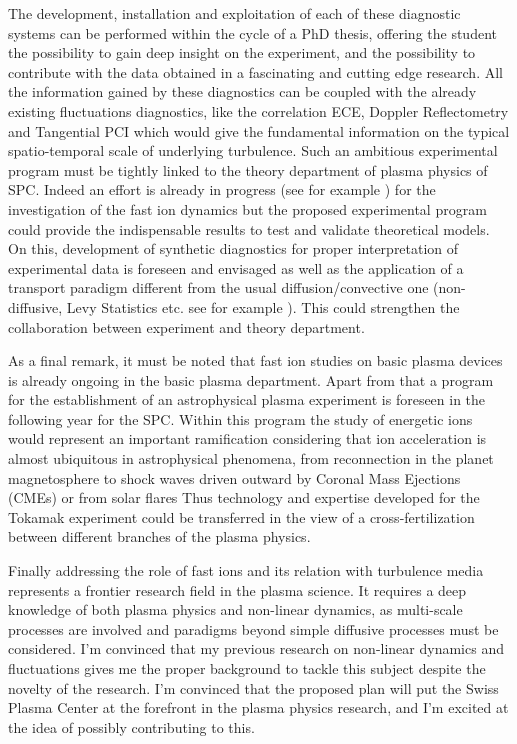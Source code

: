 \documentclass[12pt,a4paper]{article}
\begin{document}
The development, installation and exploitation of each of these 
diagnostic systems can be performed within the cycle of a PhD thesis, offering the
student the possibility to gain deep insight on the experiment, and
the possibility to contribute with the data obtained in a fascinating
and cutting edge research. All the information gained by these
diagnostics can be coupled with the already existing fluctuations
diagnostics, like the correlation ECE, Doppler Reflectometry and Tangential
PCI which would give the fundamental information on the typical
spatio-temporal scale of underlying turbulence. Such an ambitious
experimental program must be tightly linked to the theory department
of plasma physics of SPC. Indeed an effort is already in progress (see
for example \cite{Albergante:2011bj,Pfefferle:2014bk}) for
the investigation of the fast ion dynamics but the proposed
experimental program could provide the indispensable results to test
and validate theoretical models. On this,  development of synthetic
diagnostics for proper interpretation of experimental data is foreseen
and envisaged as well as the application of a transport paradigm different
from the usual diffusion/convective one (non-diffusive, Levy Statistics
etc. see for example \cite{Perrone:2013hp,Greco:2003fx}). This could strengthen the collaboration between
experiment and theory department. 

As a final remark, it must be noted that fast ion studies on basic
plasma devices is already ongoing in the basic plasma
department. Apart from that a program for the establishment of an
astrophysical plasma experiment is foreseen in the following year for
the SPC. 
Within this program the study of energetic ions would represent an 
important ramification considering that ion acceleration is almost ubiquitous in
astrophysical phenomena,  from reconnection in the planet
magnetosphere \cite{space-science-review} to shock waves driven
outward by Coronal Mass Ejections (CMEs) or from solar flares \cite{Reames:1999bu} 
Thus
technology and expertise developed for the Tokamak experiment could be
transferred in the view of a cross-fertilization between different
branches of the plasma physics.

Finally addressing the role of fast ions and its relation with
turbulence media represents a frontier research field in the
plasma science. It requires a deep knowledge of both plasma
physics and non-linear dynamics, as multi-scale processes are involved
and paradigms beyond simple diffusive processes must be considered. I'm
convinced that my previous research on non-linear dynamics and
fluctuations gives me the proper background to tackle this
subject despite the novelty of the research. I'm convinced that
the proposed plan will put the Swiss Plasma Center at the forefront in
the plasma physics research, and I'm excited at the idea of possibly
contributing to this.
\clearpage
\printbibliography[title=Personal publications cited,notkeyword=others, prefixnumbers={A}, resetnumbers=true]
\printbibliography[title=Other Sources, keyword=others, prefixnumbers={B}, resetnumbers=true]
\end{document}
